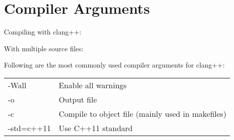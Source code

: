 \section{Compiler Arguments}
    Compiling with clang++: 

    With multiple source files: 

    Following are the most commonly used compiler arguments for clang++:
    
    \begin{tabular}{@{}l l@{}}
        -Wall & Enable all warnings \\
        -o & Output file \\
        -c & Compile to object file (mainly used in makefiles)\\
        -std=c++11 & Use C++11 standard
    \end{tabular}
